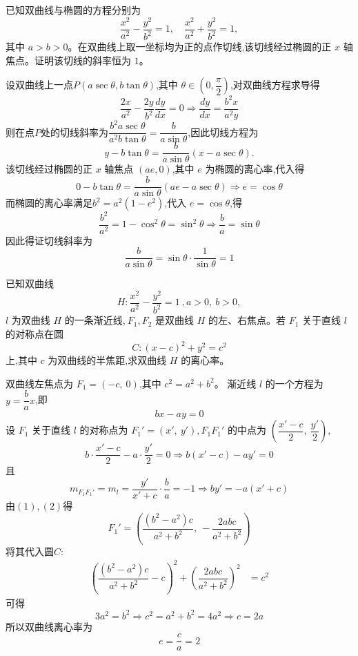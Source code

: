 \begin{questions}
    \question 已知双曲线与椭圆的方程分别为
    \[
    \frac{x^{2}}{a^{2}}-\frac{y^{2}}{b^{2}}=1,
    \quad
    \frac{x^{2}}{a^{2}}+\frac{y^{2}}{b^{2}}=1,
    \]
    其中 $a>b>0$。在双曲线上取一坐标均为正的点作切线,该切线经过椭圆的正 $x$ 轴焦点。证明该切线的斜率恒为 $1$。
    \begin{solution}
        设双曲线上一点$P(a\sec\theta,b\tan\theta)$,其中 $\theta\in\left(0,\dfrac{\pi}{2}\right)$,对双曲线方程求导得
        \[
        \frac{2x}{a^{2}}-\frac{2y}{b^{2}}\frac{dy}{dx}=0 \Rightarrow \frac{dy}{dx}=\frac{b^{2}x}{a^{2}y} 
        \]
        则在点$P$处的切线斜率为$\dfrac{b^{2}a\sec\theta}{a^{2}b\tan\theta}=\dfrac{b}{a\sin\theta}$,因此切线方程为
        \[
        y-b\tan\theta=\frac{b}{a\sin\theta}(x-a\sec\theta).
        \]
        该切线经过椭圆的正 $x$ 轴焦点 $(ae,0)$,其中 $e$ 为椭圆的离心率,代入得
        \[
        0-b\tan\theta=\frac{b}{a\sin\theta}(ae-a\sec\theta) \Rightarrow e = \cos\theta
        \]
        而椭圆的离心率满足$b^{2}=a^{2}(1-e^{2})$,代入 $e=\cos\theta$,得
        \[
        \frac{b^{2}}{a^{2}}=1-\cos^{2}\theta=\sin^{2}\theta \Rightarrow \frac{b}{a}=\sin\theta
        \]
        因此得证切线斜率为
        \[
        \frac{b}{a\sin\theta}=\sin\theta\cdot\frac{1}{\sin\theta}=1
        \]
    \end{solution}

    \question 已知双曲线 
    \[
    H: \dfrac{x^2}{a^2} - \dfrac{y^2}{b^2} = 1\ ,a > 0,\ b > 0,
    \]
    $l$ 为双曲线 $H$ 的一条渐近线,$\ F_1, F_2$ 是双曲线 $H$ 的左、右焦点。若 $F_1$ 关于直线 $l$ 的对称点在圆 
    \[
    C:(x - c)^2 + y^2 = c^2
    \]
    上,其中 $c$ 为双曲线的半焦距,求双曲线 $H$ 的离心率。
    \begin{solution}
        双曲线左焦点为 $F_1 = (-c,\ 0)$,其中 $c^2 = a^2 + b^2$。  
        渐近线 $l$ 的一个方程为 $y = \dfrac{b}{a}x$,即 
        $$bx - ay = 0$$
        设 $F_1$ 关于直线 $l$ 的对称点为 $F_1' = (x',\ y'),F_1F_1'$ 的中点为 $\left(\dfrac{x'-c}{2},\ \dfrac{y'}{2} \right)$,
        \[
        b\cdot \dfrac{x'-c}{2} - a\cdot \dfrac{y'}{2} = 0 \Rightarrow b(x'-c) - a y' = 0 \tag{1}
        \]
        且
        \[
        m_{F_1F_1'}=m_{l}=\dfrac{y'}{x'+c} \cdot \dfrac{b}{a} = -1 \Rightarrow b y' = -a(x'+c) \tag{2}
        \]
        由$(1),(2)$得
        \[
        F_1' = \left( \dfrac{(b^2 - a^2)c}{a^2 + b^2},\ -\dfrac{2ab c}{a^2 + b^2} \right)
        \]
        将其代入圆$C$:
        \begin{align*}
        \left( \dfrac{(b^2 - a^2)c}{a^2 + b^2} - c \right)^2 + \left( \dfrac{2ab c}{a^2 + b^2} \right)^2 &= c^2 
        \end{align*}
        可得
        \[
        3a^2 = b^2 \Rightarrow c^2 = a^2 + b^2 = 4a^2 \Rightarrow c = 2a
        \]
        所以双曲线离心率为
        \[
        e = \frac{c}{a} = 2
        \]
    \end{solution}


\end{questions}
